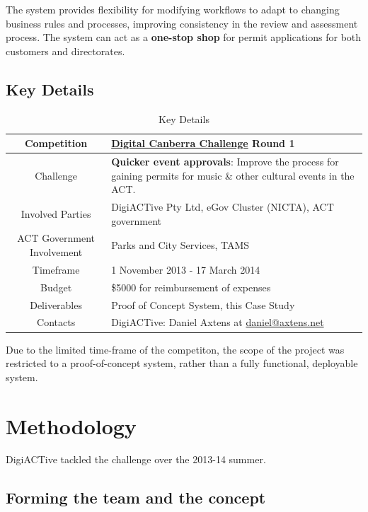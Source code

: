 \documentclass[12pt,a4paper,twosided]{article}
\begin{document}
The system provides flexibility for modifying workflows to adapt to
changing business rules and processes, improving consistency in the
review and assessment process. The system can act as a \textbf{one-stop
shop} for permit applications for both customers and directorates.

\subsection{Key Details}


\begin{table}[h!]
  \centering
  \begin{tabular}{|c|l|}
    \hline
Competition & \href{http://digitalcanberrachallenge.com.au}{Digital Canberra Challenge} Round 1 \\ \hline
Challenge & \textbf{Quicker event approvals}: Improve the process for gaining permits for music \& other cultural events in the ACT. \\ \hline
Involved Parties & DigiACTive Pty Ltd, eGov Cluster (NICTA), ACT
government \\ \hline
ACT Government Involvement & Parks and City Services, TAMS \\ \hline
Timeframe & 1 November 2013 - 17 March 2014 \\ \hline
Budget & \$5000 for reimbursement of expenses \\ \hline
Deliverables & Proof of Concept System, this Case Study \\ \hline
Contacts & DigiACTive: Daniel Axtens at
\href{mailto:daniel@axtens.net}{\href{mailto:daniel@axtens.net}{daniel@axtens.net}} \\ \hline
  \end{tabular}
  \caption{Key Details}
  \label{tab:keydetails}
\end{table}

Due to the limited time-frame of the competiton, the scope of the project was restricted to a proof-of-concept system, rather than a fully functional, deployable system.


\newpage
\section{Methodology}

DigiACTive tackled the challenge over the 2013-14 summer.

\subsection{Forming the team and the concept}
\end{document}
